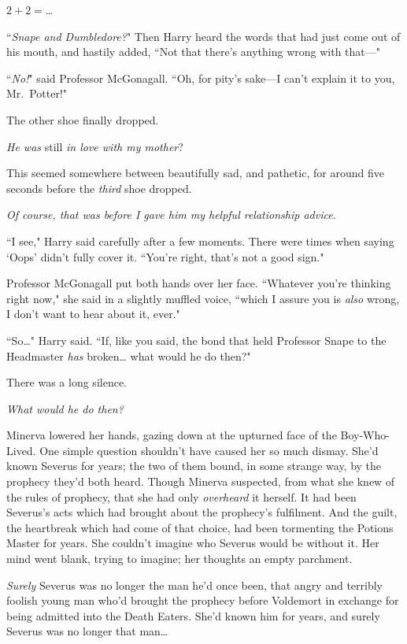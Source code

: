 $2 + 2 = ${\ldots}

``\emph{Snape and Dumbledore?}" Then Harry heard the words that had just come out of his mouth, and hastily added, ``Not that there's anything wrong with that—"

``\emph{No!}" said Professor McGonagall. ``Oh, for pity's sake—I can't explain it to you, Mr.~Potter!"

The other shoe finally dropped.

\emph{He was} still \emph{in love with my mother}?

This seemed somewhere between beautifully sad, and pathetic, for around five seconds before the \emph{third} shoe dropped.

\emph{Of course, that was before I gave him my helpful relationship advice.}

``I see," Harry said carefully after a few moments. There were times when saying `Oops' didn't fully cover it. ``You're right, that's not a good sign."

Professor McGonagall put both hands over her face. ``Whatever you're thinking right now," she said in a slightly muffled voice, ``which I assure you is \emph{also} wrong, I don't want to hear about it, ever."

``So{\ldots}" Harry said. ``If, like you said, the bond that held Professor Snape to the Headmaster \emph{has} broken{\ldots} what would he do then?"

There was a long silence.

\later

\emph{What would he do then?}

Minerva lowered her hands, gazing down at the upturned face of the Boy-Who-Lived. One simple question shouldn't have caused her so much dismay. She'd known Severus for years; the two of them bound, in some strange way, by the prophecy they'd both heard. Though Minerva suspected, from what she knew of the rules of prophecy, that she had only \emph{overheard} it herself. It had been Severus's acts which had brought about the prophecy's fulfilment. And the guilt, the heartbreak which had come of that choice, had been tormenting the Potions Master for years. She couldn't imagine who Severus would be without it. Her mind went blank, trying to imagine; her thoughts an empty parchment.

\emph{Surely} Severus was no longer the man he'd once been, that angry and terribly foolish young man who'd brought the prophecy before Voldemort in exchange for being admitted into the Death Eaters. She'd known him for years, and surely Severus was no longer that man{\ldots}

